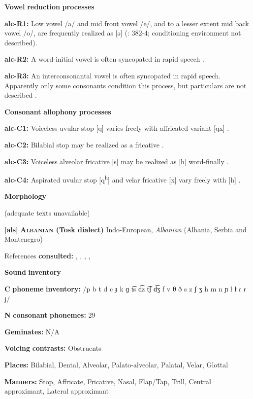 \textbf{Vowel} \textbf{reduction} \textbf{processes}

\textbf{alc-R1:} Low vowel /a/ and mid front vowel /e/, and to a lesser extent mid back vowel /o/, are frequently realized as [ə] (\citealt{Clairis1985}: 382-4; conditioning environment not described).

\textbf{alc-R2:} A word-initial vowel is often syncopated in rapid speech \citep[393]{Clairis1985}.

\textbf{alc-R3:} An interconsonantal vowel is often syncopated in rapid speech. Apparently only some consonants condition this process, but particulars are not described \citep[393]{Clairis1985}.

\textbf{Consonant} \textbf{allophony} \textbf{processes}

\textbf{alc-C1:} Voiceless uvular stop [q] varies freely with affricated variant [qx] \citep[378]{Clairis1985}.

\textbf{alc-C2:}  Bilabial stop may be realized as a fricative \citep{Aguilera2001}.

\textbf{alc-C3:} Voiceless alveolar fricative [s] may be realized as [h] word-finally \citep[372]{Clairis1985}.

\textbf{alc-C4:} Aspirated uvular stop [q\textsuperscript{h}] and velar fricative [x] vary freely with [h] \citep[377-8]{Clairis1985}.

\textbf{Morphology}

(adequate texts unavailable)

\textbf{[als]}   \textbf{\textsc{Albanian} \textbf{(Tosk} \textbf{dialect)}}  Indo-European, \textit{Albanian} (Albania, Serbia and Montenegro)

References \textbf{consulted:} \citet{Bevington1974}, \citet{Klippenstein2010}, \citet{Newmark1957}, \citet{NewmarkEtAl1982}, \citet{Trommer2013}

\textbf{Sound} \textbf{inventory}

\textbf{C} \textbf{phoneme} \textbf{inventory:} /p b t d c ɟ k ɡ t͡s d͡z t͡ʃ d͡ʒ f v θ ð s z ʃ ʒ h m n ɲ l ɫ ɾ r j/

\textbf{N} \textbf{consonant} \textbf{phonemes:} 29

\textbf{Geminates:} N/A

\textbf{Voicing} \textbf{contrasts:} Obstruents

\textbf{Places:} Bilabial, Dental, Alveolar, Palato-alveolar, Palatal, Velar, Glottal

\textbf{Manners:} Stop, Affricate, Fricative, Nasal, Flap/Tap, Trill, Central approximant, Lateral approximant

